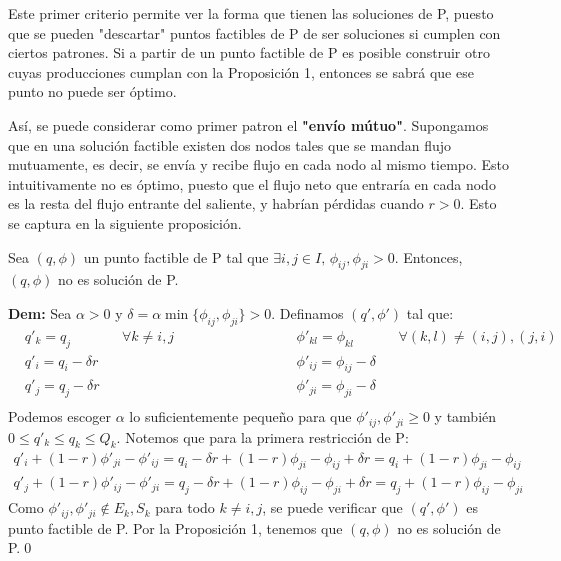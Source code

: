 \documentclass[12pt,twoside]{article}
\newenvironment{proposicion}[2][\(\blacksquare\) Proposici\'on]{\begin{trivlist}
		\item[\hskip \labelsep {\bfseries #1}\hskip \labelsep {\bfseries #2.}]}{\end{trivlist}}
\begin{document}
	\vspace{0.4cm}
	
	\hspace{1cm} Este primer criterio permite ver la forma que tienen las soluciones de P, puesto que se pueden "descartar" puntos factibles de P de ser soluciones si cumplen con ciertos patrones. Si a partir de un punto factible de P es posible construir otro cuyas producciones cumplan con la Proposici\'on 1, entonces se sabr\'a que ese punto no puede ser \'optimo.
	
	\hspace{1cm} As\'i, se puede considerar como primer patron el \textbf{"env\'io m\'utuo"}. Supongamos que en una soluci\'on factible existen dos nodos tales que se mandan flujo mutuamente, es decir, se env\'ia y recibe flujo en cada nodo al mismo tiempo. Esto intuitivamente no es \'optimo, puesto que el flujo neto que entrar\'ia en cada nodo es la resta del flujo entrante del saliente, y habr\'ian p\'erdidas cuando \(r>0\). Esto se captura en la siguiente proposici\'on.
	
	\vspace{0.4cm}
	\begin{proposicion}{2} Sea \((q,\phi)\) un punto factible de P tal que \(\exists i,j \in I,\, \phi_{ij},\phi_{ji}>0\). Entonces, \((q,\phi)\) no es soluci\'on de P.
	\end{proposicion}
	\textbf{Dem:} Sea \(\alpha>0\) y \(\delta=\alpha\min\{\phi_{ij},\phi_{ji}\}>0\). Definamos \((q',\phi')\) tal que:
	\begin{equation*}
		\begin{aligned}
			&  q'_k=q_j  & &  \forall k\neq i,j  & \hspace{3cm} & \phi'_{kl}=\phi_{kl} & & \forall (k,l)\neq (i,j),(j,i) \\
			&  q'_i=q_i-\delta r & &    & & \phi'_{ij}=\phi_{ij}-\delta \\
			&  q'_j=q_j-\delta r & &    & & \phi'_{ji}=\phi_{ji}-\delta \\
		\end{aligned}
	\end{equation*}
	Podemos escoger \(\alpha\) lo suficientemente peque\~{n}o para que \(\phi'_{ij},\phi'_{ji}\geq0\) y tambi\'en \(0\leq q'_k\leq q_k\leq Q_k\). Notemos que para la primera restricci\'on de P:
	\begin{equation*}
		\begin{aligned}
			q'_i+(1-r)\phi'_{ji}-\phi'_{ij}=q_i-\delta r+(1-r)\phi_{ji}-\phi_{ij}+\delta r=q_i+(1-r)\phi_{ji}-\phi_{ij} \\
			q'_j+(1-r)\phi'_{ij}-\phi'_{ji}=q_j-\delta r+(1-r)\phi_{ij}-\phi_{ji}+\delta r=q_j+(1-r)\phi_{ij}-\phi_{ji}
		\end{aligned}
	\end{equation*}
	Como \(\phi'_{ij},\phi'_{ji}\notin E_k,S_k\) para todo \(k\neq i,j\), se puede verificar que \((q',\phi')\) es punto factible de P. Por la Proposici\'on 1, tenemos que \((q,\phi)\) no es soluci\'on de P.\qed
	
\end{document}
